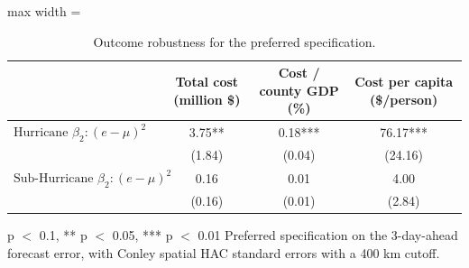\begin{table}

\caption{Outcome robustness for the preferred specification. \label{tab:cost_outcomes}}
\centering
\begin{adjustbox}{max width = \textwidth}
\begin{threeparttable}
\begin{tabular}[t]{lccc}
\toprule
  & Total cost (million \$) & Cost / county GDP (\%) & Cost per capita (\$/person)\\
\midrule
$\text{Hurricane } \beta_2: (e - \mu)^2$ & 3.75** & 0.18*** & 76.17***\\
 & (1.84) & (0.04) & (24.16)\\
$\text{Sub-Hurricane } \beta_2: (e - \mu)^2$ & 0.16 & 0.01 & 4.00\\
 & (0.16) & (0.01) & (2.84)\\
\bottomrule
\end{tabular}
\begin{tablenotes}
\item * p $<$ 0.1, ** p $<$ 0.05, *** p $<$ 0.01 Preferred specification on the 3-day-ahead forecast error, with Conley spatial HAC standard errors with a 400 km cutoff.
\end{tablenotes}
\end{threeparttable}
\end{adjustbox}
\end{table}
